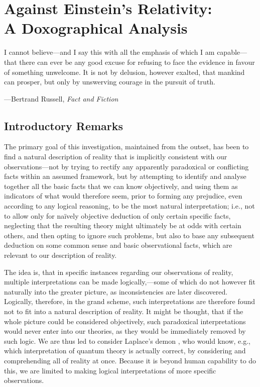 \chapter[Against Einstein's Relativity: A Doxographical Analysis]{Against Einstein's Relativity:\\A Doxographical Analysis\label{chap_AER}}
\epigraph{I cannot believe---and I say this with all the emphasis of which I am capable---that there can ever be any good excuse for refusing to face the evidence in favour of something unwelcome. It is not by delusion, however exalted, that mankind can prosper, but only by unswerving courage in the pursuit of truth.}{---Bertrand Russell, \textit{Fact and Fiction}}
\section{Introductory Remarks\label{sec_IR}}
The primary goal of this investigation, maintained from the outset, has been to find a natural description of reality that is implicitly consistent with our observations---not by trying to rectify any apparently paradoxical or conflicting facts within an assumed framework, but by attempting to identify and analyse together all the basic facts that we can know objectively, and using them as indicators of what would therefore seem, prior to forming any prejudice, even according to any logical reasoning, to be the most natural interpretation; i.e., not to allow only for na\"{i}vely objective deduction of only certain specific facts, neglecting that the resulting theory might ultimately be at odds with certain others, and then opting to ignore such problems, but also to base any subsequent deduction on some common sense and basic observational facts, which are relevant to our description of reality. 

The idea is, that in specific instances regarding our observations of reality, multiple interpretations can be made logically,---some of which do not however fit naturally into the greater picture, as inconsistencies are later discovered. Logically, therefore, in the grand scheme, such interpretations are therefore found not to fit into a natural description of reality. It might be thought, that if the whole picture could be considered objectively, such paradoxical interpretations would never enter into our theories, as they would be immediately removed by such logic. We are thus led to consider Laplace's demon \cite{Laplace1951}, who would know, e.g., which interpretation of quantum theory is actually correct, by considering and comprehending all of reality at once. Because it is beyond human capability to do this, we are limited to making logical interpretations of more specific observations.

